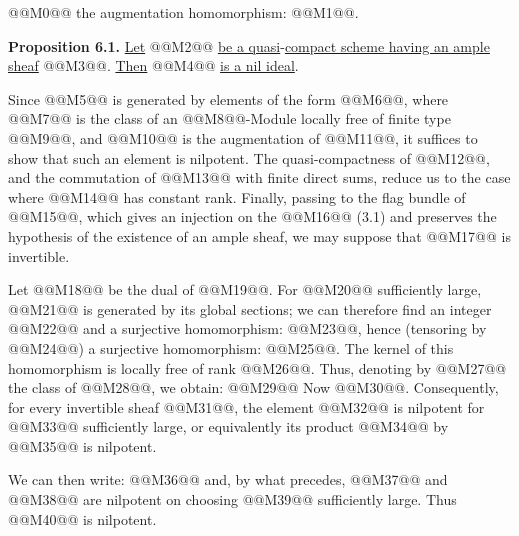 @@M0@@ the augmentation homomorphism: @@M1@@.

\textbf{Proposition 6.1.} \uline{Let} @@M2@@ \uline{be a quasi}-\uline{compact scheme having an ample sheaf} @@M3@@. \uline{Then} @@M4@@ \uline{is a nil ideal}.

Since @@M5@@ is generated by elements of the form @@M6@@, where @@M7@@ is the class of an @@M8@@-Module locally free of finite type @@M9@@, and @@M10@@ is the augmentation of @@M11@@, it suffices to show that such an element is nilpotent. The quasi-compactness of @@M12@@, and the commutation of @@M13@@ with finite direct sums, reduce us to the case where @@M14@@ has constant rank. Finally, passing to the flag bundle of @@M15@@, which gives an injection on the @@M16@@ (3.1) and preserves the hypothesis of the existence of an ample sheaf, we may suppose that @@M17@@ is invertible.

Let @@M18@@ be the dual of @@M19@@. For @@M20@@ sufficiently large, @@M21@@ is generated by its global sections; we can therefore find an integer @@M22@@ and a surjective homomorphism: @@M23@@, hence (tensoring by @@M24@@) a surjective homomorphism: @@M25@@. The kernel of this homomorphism is locally free of rank @@M26@@. Thus, denoting by @@M27@@ the class of @@M28@@, we obtain:
@@M29@@
Now @@M30@@. Consequently, for every invertible sheaf @@M31@@, the element @@M32@@ is nilpotent for @@M33@@ sufficiently large, or equivalently its product @@M34@@ by @@M35@@ is nilpotent.

We can then write:
@@M36@@
and, by what precedes, @@M37@@ and @@M38@@ are nilpotent on choosing @@M39@@ sufficiently large. Thus @@M40@@ is nilpotent.

